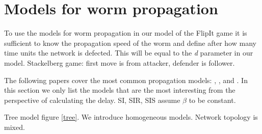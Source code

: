 \begin{description}
\end{description}

 

\section{Models for worm propagation}
\label{modelsforpropagation}
To use the models for worm propagation in our model of the FlipIt game it is sufficient to know the propagation speed of the worm and define after how many time units the network is defected. This will be equal to the \textit{d} parameter in our model.  
Stackelberg game: first move is from attacker, defender is follower. 

The following papers cover the most common propagation models: \cite{wang2014modeling}, \cite{OnWorms2005survey}, \cite{xiang2009propagation} and \cite{serazzi2004computer}.
In this section we only list the models that are the most interesting from the perspective of calculating the delay.
SI, SIR, SIS assume $\beta$ to be constant.

Tree model figure \ref{tree}. We introduce homogeneous models. Network topology is mixed. 

